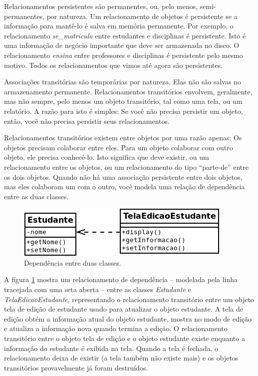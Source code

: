 \documentclass[
	11pt,				%
	openright,
	twoside,			%
	a4paper,			%
	english,			%
	french,
	brazil,				%
	sumario=tradicional
	]{abntex2}
\begin{document}
Relacionamentos persistentes são permanentes, ou, pelo menos, semi-permanentes, por natureza. Um relacionamento de objetos é persistente se a informação para mantê-lo é salva em memória permanente. Por exemplo, o relacionamento \emph{se\_matricula} entre estudantes e disciplinas é persistente. Isto é uma informação de negócio importante que deve ser armazenada no disco. O relacionamento \emph{ensina} entre professores e disciplinas é persistente pelo mesmo motivo. Todos os relacionamentos que vimos até agora são persistentes.

Associações transitórias são temporárias por natureza. Elas não são salvas no armazenamento permanente. Relacionamentos transitórios envolvem, geralmente, mas não sempre, pelo menos um objeto transitório, tal como uma tela, ou um relatório. A razão para isto é simples: Se você não precisa persistir um objeto, então, você não precisa persistir seus relacionamentos.

Relacionamentos transitórios existem entre objetos por uma razão apenas: Os objetos precisam colaborar entre eles. Para um objeto colaborar com outro objeto, ele precisa conhecê-lo. Isto significa que deve existir, ou um relacionamento entre os objetos, ou um relacionamento do tipo ``parte-de'' entre os dois objetos. Quando não há uma associação persistente  entre dois objetos, mas eles colaboram um com o outro, você modela uma relação de dependência entre as duas classes.

\begin{figure}[h]
\begin{center}
\includegraphics[scale=0.7]{classDep.png}
\end{center}
\caption{Dependência entre duas classes.} \label{fig:clsDep}
\end{figure}

A figura \ref{fig:clsDep} mostra um relacionamento de dependência -- modelada pela linha tracejada com uma seta aberta -- entre as classes \emph{Estudante} e \emph{TelaEdicaoEstudante}, representando o relacionamento transitório entre um objeto tela de edição de estudante usado para atualizar o objeto estudante. A tela de edição obtém a informação atual do objeto estudante, mostra no modo de edição e atualiza a informação nova quando termina a edição. O relacionamento transitório entre o objeto tela de edição e o objeto estudante existe enquanto a informação do estudante é exibida na tela. Quando a tela é fechada, o relacionamento deixa de existir (a tela também não existe mais) e os objetos transitórios provavelmente já foram destruídos.
\end{document}
